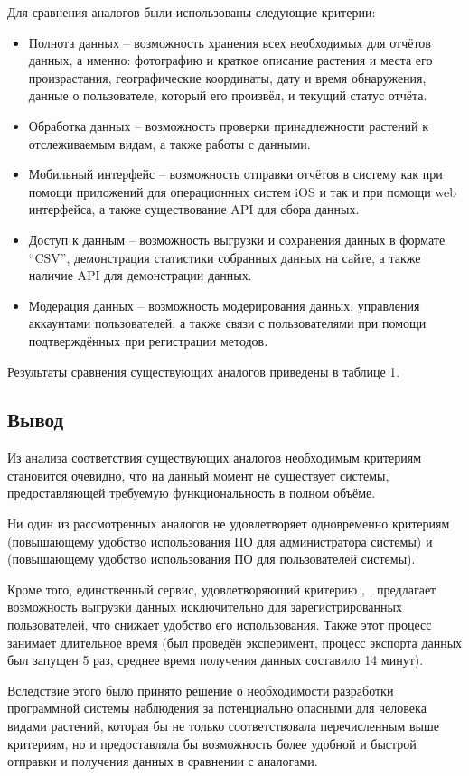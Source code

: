 \tab
Для сравнения аналогов были использованы следующие критерии:

\begin{itemize}
	\item Полнота данных -- возможность хранения всех необходимых для отчётов данных, а именно: фотографию и краткое описание растения и места его произрастания, географические координаты, дату и время обнаружения, данные о пользователе, который его произвёл, и текущий статус отчёта.
	\item Обработка данных -- возможность проверки принадлежности растений к отслеживаемым видам, а также работы с данными.
	\item Мобильный интерфейс -- возможность отправки отчётов в систему как при помощи приложений для операционных систем iOS и  так и при помощи web интерфейса, а также существование API для сбора данных.
	\item Доступ к данным -- возможность выгрузки и сохранения данных в формате “CSV”, демонстрация статистики собранных данных на сайте, а также наличие API для демонстрации данных.
	\item Модерация данных -- возможность модерирования данных, управления аккаунтами пользователей, а также связи с пользователями при помощи подтверждённых при регистрации методов.
\end{itemize}

\tab
Результаты сравнения существующих аналогов приведены в таблице 1.
\tableone

\subsection{Вывод}

\tab
Из анализа соответствия существующих аналогов необходимым критериям становится очевидно, что на данный момент не существует системы, предоставляющей требуемую функциональность в полном объёме.

\tab
Ни один из рассмотренных аналогов не удовлетворяет одновременно критериям  (повышающему удобство использования ПО для администратора системы) и  (повышающему удобство использования ПО для пользователей системы).

\tab
Кроме того, единственный сервис, удовлетворяющий критерию , , предлагает возможность выгрузки данных\cite{inaturalist-export} исключительно для зарегистрированных пользователей, что снижает удобство его использования.
Также этот процесс занимает длительное время (был проведён эксперимент, процесс экспорта данных был запущен 5 раз, среднее время получения данных составило 14 минут).

\tab
Вследствие этого было принято решение о необходимости разработки программной системы наблюдения за потенциально опасными для человека видами растений, которая бы не только соответствовала перечисленным выше критериям, но и предоставляла бы возможность более удобной и быстрой отправки и получения данных в сравнении с аналогами.
